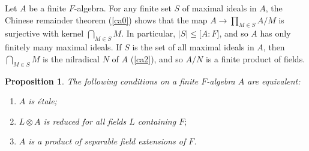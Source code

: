 \documentclass[a4paper,11pt,final,openany]{memoir}
\newtheorem{proposition}[X]{Proposition}
\theoremstyle{nonumberplain}
\begin{document}
Let $A$ be a finite $F$-algebra. For any finite set $S$ of maximal ideals in
$A$, the Chinese remainder theorem (\ref{ca0}) shows that the map
$A\rightarrow\prod\nolimits_{M{}\in S}A/M{}$ is surjective with kernel
$\bigcap\nolimits_{M{}\in S}M{}$. In particular, $\left\vert S\right\vert
\leq\lbrack A\colon F]$, and so $A$ has only finitely many maximal ideals. If
$S$ is the set of all maximal ideals in $A$, then $\bigcap\nolimits_{M{}\in
S}M$ is the nilradical $N$ of $A$ (\ref{ca2}), and so $A/N{}$ is a finite
product of fields.

\begin{proposition}
\label{B66}The following conditions on a finite $F$-algebra $A$ are equivalent:

\begin{enumerate}
\item $A$ is \'{e}tale;

\item $L\otimes A$ is reduced for all fields $L$ containing $F;$

\item $A$ is a product of separable field extensions of $F$.
\end{enumerate}
\end{proposition}
\end{document}

